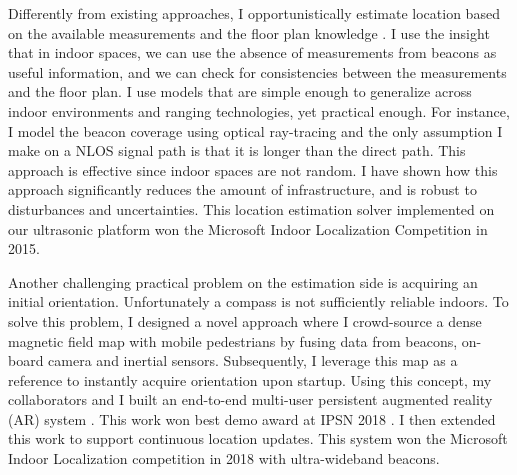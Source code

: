 \documentclass[10pt]{article}
\begin{document}
Differently from existing approaches, I opportunistically estimate location based on the available measurements and the floor plan knowledge \cite{rajagopal2018enhancing}. I use the insight that in indoor spaces, we can use the absence of measurements from beacons as useful information, and we can check for consistencies between the measurements and the floor plan. I use models that are simple enough to generalize across indoor environments and ranging technologies, yet practical enough. For instance, I model the beacon coverage using optical ray-tracing and the only assumption I make on a NLOS signal path is that it is longer than the direct path. This approach is effective since indoor spaces are not random. %
I have shown how this approach significantly reduces the amount of infrastructure, and is robust to disturbances and uncertainties. %
This location estimation solver implemented on our ultrasonic platform won the Microsoft Indoor Localization Competition in 2015. %

Another challenging practical problem on the estimation side is acquiring an initial orientation. Unfortunately a compass is not sufficiently reliable indoors. 
To solve this problem, I designed a novel approach where I crowd-source a dense magnetic field map with mobile pedestrians by fusing data from beacons, on-board camera and inertial sensors. Subsequently, I leverage this map as a reference to instantly acquire orientation upon startup. 
Using this concept, my collaborators and I built an end-to-end multi-user persistent augmented reality (AR) system \cite{mobileAR}. This work won best demo award at IPSN 2018 \cite{rajagopal2018welcome}. I then extended this work to support continuous location updates. This system won the Microsoft Indoor Localization competition in 2018 with ultra-wideband beacons. 
\end{document}
